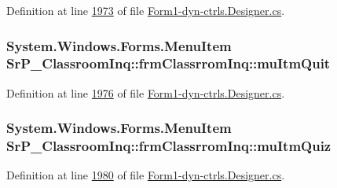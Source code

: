 \-Definition at line \hyperlink{_form1-dyn-ctrls_8_designer_8cs_source_l01973}{1973} of file \hyperlink{_form1-dyn-ctrls_8_designer_8cs_source}{\-Form1-\/dyn-\/ctrls.\-Designer.\-cs}.

\hypertarget{class_sr_p___classroom_inq_1_1frm_classrrom_inq_a139fd89a3fbbc5272712ac921557dd03}{
\subsubsection[{mu\-Itm\-Quit}]{\setlength{\rightskip}{0pt plus 5cm}\-System.\-Windows.\-Forms.\-Menu\-Item {\bf \-Sr\-P\-\_\-\-Classroom\-Inq\-::frm\-Classrrom\-Inq\-::mu\-Itm\-Quit}}}
\label{class_sr_p___classroom_inq_1_1frm_classrrom_inq_a139fd89a3fbbc5272712ac921557dd03}


\-Definition at line \hyperlink{_form1-dyn-ctrls_8_designer_8cs_source_l01976}{1976} of file \hyperlink{_form1-dyn-ctrls_8_designer_8cs_source}{\-Form1-\/dyn-\/ctrls.\-Designer.\-cs}.

\hypertarget{class_sr_p___classroom_inq_1_1frm_classrrom_inq_a081ac032f68b26f56aaf3c859fb5faa3}{
\subsubsection[{mu\-Itm\-Quiz}]{\setlength{\rightskip}{0pt plus 5cm}\-System.\-Windows.\-Forms.\-Menu\-Item {\bf \-Sr\-P\-\_\-\-Classroom\-Inq\-::frm\-Classrrom\-Inq\-::mu\-Itm\-Quiz}}}
\label{class_sr_p___classroom_inq_1_1frm_classrrom_inq_a081ac032f68b26f56aaf3c859fb5faa3}


\-Definition at line \hyperlink{_form1-dyn-ctrls_8_designer_8cs_source_l01980}{1980} of file \hyperlink{_form1-dyn-ctrls_8_designer_8cs_source}{\-Form1-\/dyn-\/ctrls.\-Designer.\-cs}.

